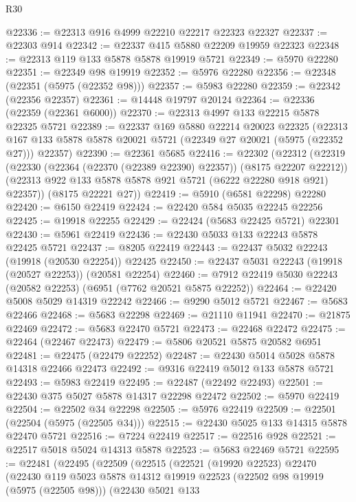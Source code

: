 \begin{lexlean}{R30}
\begin{coremodule}
@22336 := @22313 @916 @4999 @22210 @22217 @22323 @22327
@22337 := @22303 @914
@22342 := @22337 @415 @5880 @22209 @19959 @22323
@22348 := @22313 @119 @133 @5878 @5878 @19919 @5721
@22349 := @5970 @22280
@22351 := @22349 @98 @19919
@22352 := @5976 @22280
@22356 := @22348 (@22351 (@5975 (@22352 @98)))
@22357 := @5983 @22280
@22359 := @22342 (@22356 @22357)
@22361 := @14448 @19797 @20124
@22364 := @22336 (@22359 (@22361 @6000))
@22370 := @22313 @4997 @133 @22215 @5878 @22325 @5721
@22389 := @22337
    @169
    @5880
    @22214
    @20023
    @22325
    (@22313 @167 @133 @5878 @5878 @20021 @5721 (@22349 @27 @20021 (@5975 (@22352 @27))) @22357)
@22390 := @22361 @5685
@22416 := @22302
    (@22312
      (@22319
        (@22330 (@22364 (@22370 (@22389 @22390) @22357)) (@8175 @22207 @22212))
        (@22313 @922 @133 @5878 @5878 @921 @5721 (@6222 @22280 @918 @921) @22357))
      (@8175 @22221 @27))
@22419 := @5910 (@6581 @22298) @22280
@22420 := @6150 @22419
@22424 := @22420 @584 @5035 @22245 @22256
@22425 := @19918 @22255
@22429 := @22424 (@5683 @22425 @5721) @22301
@22430 := @5961 @22419
@22436 := @22430 @5033 @133 @22243 @5878 @22425 @5721
@22437 := @8205 @22419
@22443 := @22437 @5032 @22243 (@19918 (@20530 @22254)) @22425
@22450 := @22437 @5031 @22243 (@19918 (@20527 @22253)) (@20581 @22254)
@22460 := @7912 @22419 @5030 @22243 (@20582 @22253) (@6951 (@7762 @20521 @5875 @22252))
@22464 := @22420 @5008 @5029 @14319 @22242
@22466 := @9290 @5012 @5721
@22467 := @5683 @22466
@22468 := @5683 @22298
@22469 := @21110 @11941
@22470 := @21875 @22469
@22472 := @5683 @22470 @5721
@22473 := @22468 @22472
@22475 := @22464 (@22467 @22473)
@22479 := @5806 @20521 @5875 @20582 @6951
@22481 := @22475 (@22479 @22252)
@22487 := @22430 @5014 @5028 @5878 @14318 @22466 @22473
@22492 := @9316 @22419 @5012 @133 @5878 @5721
@22493 := @5983 @22419
@22495 := @22487 (@22492 @22493)
@22501 := @22430 @375 @5027 @5878 @14317 @22298 @22472
@22502 := @5970 @22419
@22504 := @22502 @34 @22298
@22505 := @5976 @22419
@22509 := @22501 (@22504 (@5975 (@22505 @34)))
@22515 := @22430 @5025 @133 @14315 @5878 @22470 @5721
@22516 := @7224 @22419
@22517 := @22516 @928
@22521 := @22517 @5018 @5024 @14313 @5878
@22523 := @5683 @22469 @5721
@22595 := @22481
    (@22495
      (@22509
        (@22515
          (@22521
            (@19920 @22523)
            @22470
            (@22430
              @119
              @5023
              @5878
              @14312
              @19919
              @22523
              (@22502 @98 @19919 (@5975 (@22505 @98)))
              (@22430
                @5021
                @133

\end{coremodule}
\end{lexlean}
